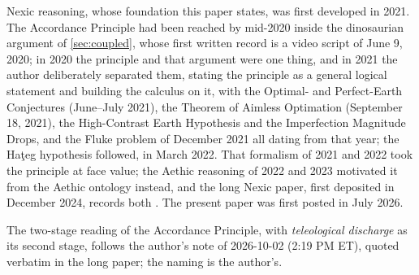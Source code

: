 \noindent Nexic reasoning, whose foundation this paper states, was first developed in 2021. The Accordance Principle had been reached by mid-2020 inside the dinosaurian argument of \autoref{sec:coupled}, whose first written record is a video script of June 9, 2020; in 2020 the principle and that argument were one thing, and in 2021 the author deliberately separated them, stating the principle as a general logical statement and building the calculus on it, with the Optimal- and Perfect-Earth Conjectures (June--July 2021), the Theorem of Aimless Optimation (September 18, 2021), the High-Contrast Earth Hypothesis and the Imperfection Magnitude Drops, and the Fluke problem of December 2021 all dating from that year; the Ha\c{t}eg hypothesis followed, in March 2022. That formalism of 2021 and 2022 took the principle at face value; the Aethic reasoning of 2022 and 2023 motivated it from the Aethic ontology instead, and the long Nexic paper, first deposited in December 2024, records both \cite{Nexus}. The present paper was first posted in July 2026.

\noindent The two-stage reading of the Accordance Principle, with \emph{teleological discharge} as its second stage, follows the author's note of 2026-10-02 (2:19 PM ET), quoted verbatim in the long paper; the naming is the author's.

\printbibliography

